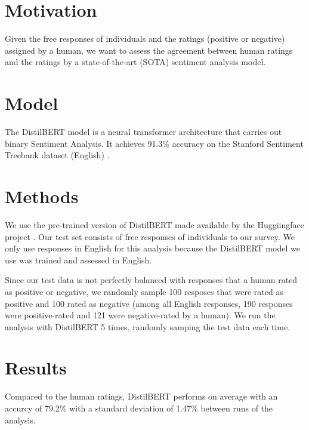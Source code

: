 \documentclass[12pt]{article}
\begin{document}
\maketitle

\section{Motivation}
Given the free responses of individuals and the ratings (positive or negative)
assigned by a human, we want to assess the agreement between human ratings and the 
ratings by a state-of-the-art (SOTA) sentiment analysis model.

\section{Model}
The DistilBERT model \cite{sanh2019distilbert} is a neural transformer architecture 
that carries out binary Sentiment Analysis. It achieves 91.3\% accuracy on the 
Stanford Sentiment Treebank dataset (English) \cite{socher2013recursive}. 

\section{Methods}
We use the pre-trained version of DistilBERT made available by the Huggiingface project \cite{wolf2019huggingface}. 
Our test set consists of free responses of individuals to our survey. We only use
responses in English for this analysis because the DistilBERT model we use was 
trained and assessed in English. 

Since our test data is not perfectly balanced with responses that a human rated as
positive or negative, we randomly sample 100 resposes that were rated as positive
and 100 rated as negative (among all English responses, 190 responses were 
positive-rated and 121 were negative-rated by a human). We run the analysis with 
DistilBERT 5 times, randomly samping the test data each time.

\section{Results}
Compared to the human ratings, DistilBERT performs on average with an accurcy of
79.2\% with a standard deviation of 1.47\% between runs of the analysis.



\end{document}
